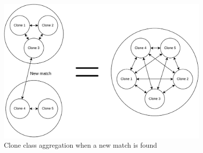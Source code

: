 \begin{figure}[t]
    \begin{center}
        \includegraphics[width=0.95\textwidth]{figures/cloneaggregation.drawio.pdf}
    \end{center}
    \caption{Clone class aggregation when a new match is found}
    \label{fig:cloneaggregation}
\end{figure}


